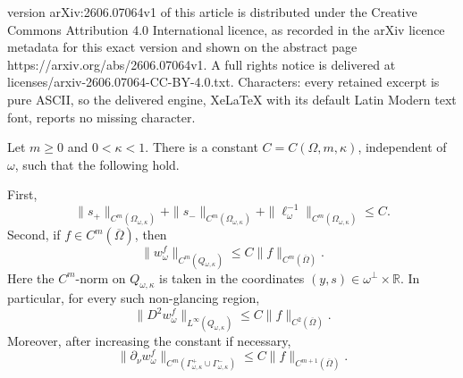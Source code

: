 \documentclass[10pt,a4paper]{amsart}
\newcommand{\Om}{\Omega}
\newcommand{\R}{\mathbb R}
\begin{document}
version arXiv:2606.07064v1 of this article is distributed under the Creative Commons Attribution 4.0 International licence, as recorded in the arXiv licence metadata for this exact version and shown on the abstract page https://arxiv.org/abs/2606.07064v1. A full rights notice is delivered at licenses/arxiv-2606.07064-CC-BY-4.0.txt. Characters: every retained excerpt is pure ASCII, so the delivered engine, XeLaTeX with its default Latin Modern text font, reports no missing character.
\begin{lemma}\label{lem:non-glancing-regularity}
Let \(m\ge0\) and \(0<\kappa<1\).  There is a constant
\(C=C(\Omega,m,\kappa)\), independent of \(\omega\), such that the following hold.

First,
\begin{equation}\label{eq:s-pm-Cm-estimates}
    \|s_+\|_{C^m(\Omega_{\omega,\kappa})}
    +
    \|s_-\|_{C^m(\Omega_{\omega,\kappa})}
    +
    \|\ell_\omega^{-1}\|_{C^m(\Omega_{\omega,\kappa})}
    \le C .
\end{equation}
Second, if \(f\in C^m(\overline\Om)\), then
\begin{equation}\label{eq:w-Cm-nonglancing-estimate}
    \|w_\omega^f\|_{C^m(Q_{\omega,\kappa})}
    \le
    C\|f\|_{C^m(\overline\Om)} .
\end{equation}
Here the \(C^m\)-norm on \(Q_{\omega,\kappa}\) is taken in the coordinates \((y,s)\in\omega^\perp\times\R\).  In particular, for every such non-glancing region,
\begin{equation}\label{eq:w-C2-nonglancing-estimate}
    \|D^2 w_\omega^f\|_{L^\infty(Q_{\omega,\kappa})}
    \le
    C\|f\|_{C^2(\overline\Om)} .
\end{equation}
Moreover, after increasing the constant if necessary,
\begin{equation}\label{eq:normal-derivative-nonglancing-estimate}
    \|\partial_\nu w_\omega^f\|_{C^m(\Gamma_{\omega,\kappa}^+\cup\Gamma_{\omega,\kappa}^-)}
    \le
    C\|f\|_{C^{m+1}(\overline\Om)} .
\end{equation}
\end{lemma}
\end{document}
